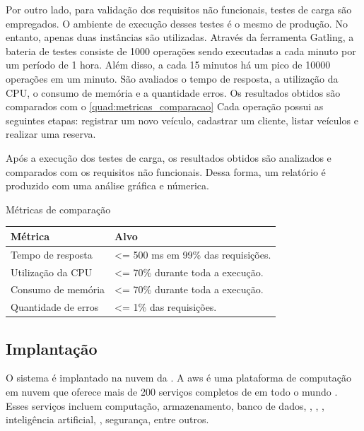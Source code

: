 Por outro lado, para validação dos requisitos não funcionais, testes de carga são empregados. O ambiente de execução desses testes é o mesmo de produção. No entanto, apenas duas instâncias são utilizadas. Através da ferramenta Gatling, a bateria de testes consiste de 1000 operações sendo executadas a cada minuto por um período de 1 hora. Além disso, a cada 15 minutos há um pico de 10000 operações em um minuto. São avaliados o tempo de resposta, a utilização da CPU, o consumo de memória e a quantidade erros. Os resultados obtidos são comparados com o \autoref{quad:metricas_comparacao} Cada operação possui as seguintes etapas: registrar um novo veículo, cadastrar um cliente, listar veículos e realizar uma reserva.

Após a execução dos testes de carga, os resultados obtidos são analizados e comparados com os requisitos não funcionais. Dessa forma, um relatório é produzido com uma análise gráfica e númerica.

\begin{quadro}[H]
    \centering
    \caption{Métricas de comparação}
    \label{quad:metricas_comparacao}
    \begin{tabular}{|p{1.2in}|p{3.5in}|}
    \hline
    
    \textbf{Métrica} & \textbf{Alvo} \\ \hline
    Tempo de resposta & <= 500 ms em 99\% das requisições. \\ \hline
    Utilização da CPU & <= 70\% durante toda a execução. \\ \hline
    Consumo de memória & <= 70\% durante toda a execução. \\ \hline
    Quantidade de erros & <= 1\% das requisições. \\ \hline

    \end{tabular}
\end{quadro}

\subsection{Implantação}
O sistema é implantado na nuvem da . A \acrshort{aws} é uma plataforma de computação em nuvem que oferece mais de 200 serviços completos de  em todo o mundo \cite{aws}. Esses serviços incluem computação, armazenamento, banco de dados, , , , inteligência artificial, , segurança, entre outros.

